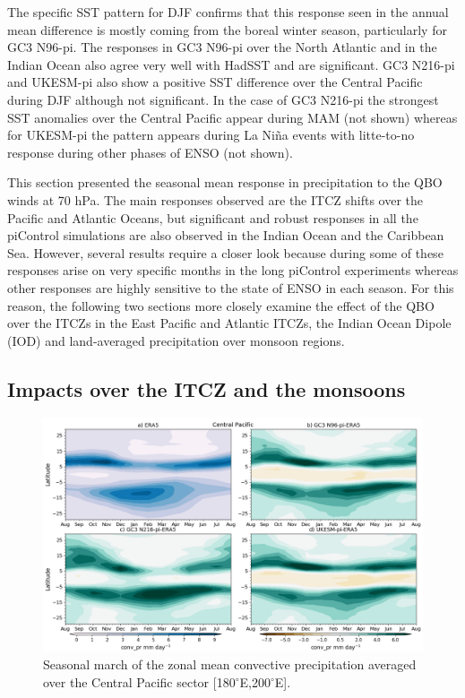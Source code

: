 The specific SST pattern for DJF confirms that this response seen in the annual mean difference is mostly coming from the boreal winter season, particularly for GC3 N96-pi. The responses in GC3 N96-pi over the North Atlantic and in the Indian Ocean also agree very well with HadSST and are significant. GC3 N216-pi and UKESM-pi also show a positive SST difference over the Central Pacific during DJF although not significant. 
In the case of GC3 N216-pi the strongest SST anomalies over the Central Pacific appear during MAM (not shown) whereas for UKESM-pi the pattern appears during La Niña events with litte-to-no response during other phases of ENSO (not shown). 

This section presented the seasonal mean response in precipitation to the QBO winds at 70 hPa. The main responses observed are the ITCZ shifts over the Pacific and Atlantic Oceans, but significant and robust responses in all the piControl simulations are also observed in the Indian Ocean and the Caribbean Sea.  However, several results require a closer look because during some of these responses arise on very specific months in the long piControl experiments whereas other responses are highly sensitive to the state of ENSO in each season. 
For this reason, the following two sections more closely examine the effect of the QBO over the ITCZs in the East Pacific and Atlantic ITCZs, the Indian Ocean Dipole (IOD) and land-averaged precipitation over monsoon regions. 

\subsection{Impacts over the ITCZ and the monsoons}

\begin{figure}[t!]
\centering
 \includegraphics[width=\linewidth]{figures/climcmip_bconv_prcp.png}
\caption[ITCZ seasonal cycle and biases in the Central Pacific.]{Seasonal march of the zonal mean convective precipitation averaged over the Central Pacific sector [180$^\circ$E,200$^\circ$E].}
\label{fig:itczclimcp}
\end{figure}

